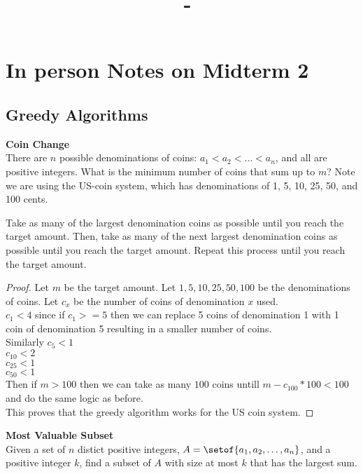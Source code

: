 \documentclass[answers,12pt,addpoints]{exam}
\author{\name}
\title{\course \ - \assignment}
\begin{document}
\maketitle
\tableofcontents
\newpage 
\section{In person Notes on Midterm 2}

\newpage
\begin{questions}
\section{Greedy Algorithms}
\question\textbf{Coin Change}\\
There are $n$ possible denominations of coins: $a_1 < a_2 < \dots < a_n$, and all are
positive integers. What is the minimum number of coins that sum up to $m$? Note we are using the US-coin system, which has denominations of 1, 5, 10, 25, 50, and 100 cents.
\begin{solution}
    Take as many of the largest denomination coins as possible until you reach the target amount. Then, take as many of the next largest denomination coins as possible until you reach the target amount. Repeat this process until you reach the target amount.
    \begin{proof}
        Let $m$ be the target amount. Let $1, 5, 10, 25, 50, 100$ be the denominations of coins. Let $c_x$ be the number of coins of denomination $x$ used. \\
        $c_1 < 4$ since if $c_1 >= 5$ then we can replace 5 coins of denomination 1 with 1 coin of denomination 5 resulting in a smaller number of coins.\\
        Similarly $c_5 < 1$\\
        $c_{10} < 2$\\
        $c_{25} < 1$\\
        $c_{50} < 1$\\
        Then if $m>100$ then we can take as many $100$ coins untill $m - c_{100} *100 < 100$ and do the same logic as before. \\
        This proves that the greedy algorithm works for the US coin system.
    \end{proof}
\end{solution}
\question\textbf{Most Valuable Subset}\\
Given a set of $n$ distict positive integers, $A = \setof{a_1, a_2, \dots, a_n}$, and a positive integer $k$, find a subset of $A$ with size at most $k$ that has the largest sum.

\end{questions}
\end{document}
